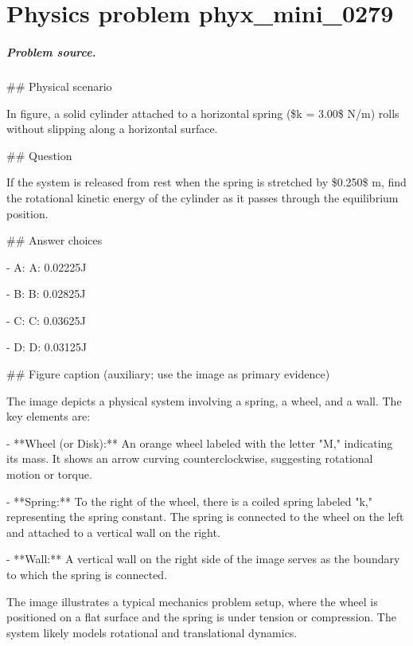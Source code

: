 
\chapter{Physics problem phyx\_mini\_0279}
\label{ch:PhyXMiniProblems_problem_phyx_mini_0279}

\paragraph{Problem source.}
\#\# Physical scenario

In figure, a solid cylinder attached to a horizontal spring (\$k = 3.00\$ N/m) rolls without slipping along a horizontal surface.

\#\# Question

If the system is released from rest when the spring is stretched by \$0.250\$ m, find the rotational kinetic energy of the cylinder as it passes through the equilibrium position.

\#\# Answer choices

- A: A: 0.02225J

- B: B: 0.02825J

- C: C: 0.03625J

- D: D: 0.03125J

\#\# Figure caption (auxiliary; use the image as primary evidence)

The image depicts a physical system involving a spring, a wheel, and a wall. The key elements are:

- **Wheel (or Disk):** An orange wheel labeled with the letter "M," indicating its mass. It shows an arrow curving counterclockwise, suggesting rotational motion or torque.

- **Spring:** To the right of the wheel, there is a coiled spring labeled "k," representing the spring constant. The spring is connected to the wheel on the left and attached to a vertical wall on the right.

- **Wall:** A vertical wall on the right side of the image serves as the boundary to which the spring is connected.

The image illustrates a typical mechanics problem setup, where the wheel is positioned on a flat surface and the spring is under tension or compression. The system likely models rotational and translational dynamics.

